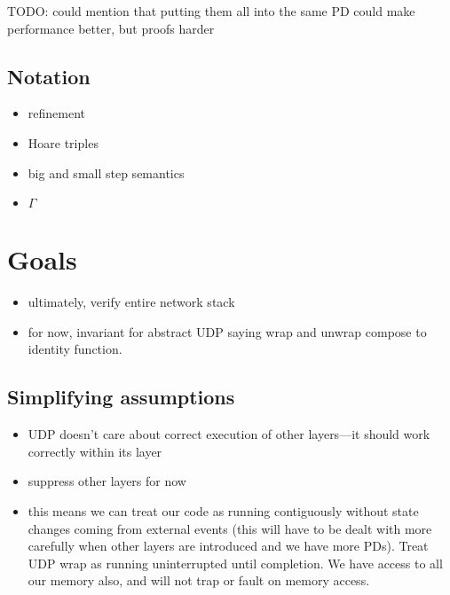 \documentclass[twoside]{memoir}
\begin{document}
TODO: could mention that putting them all into the same PD could make performance
better, but proofs harder

\subsection{Notation} %
\begin{itemize}
    \item refinement
    \item Hoare triples
    \item big and small step semantics
    \item $\Gamma$
\end{itemize}

\section{Goals}
\begin{itemize}
    \item ultimately, verify entire network stack
    \item for now, invariant for abstract UDP saying wrap and unwrap compose to identity function.
\end{itemize}

\subsection{Simplifying assumptions}
\begin{itemize}
    \item UDP doesn't care about correct execution of other layers---it should work correctly within its layer
    \item suppress other layers for now
    \item this means we can treat our code as running contiguously without state changes coming from external events (this will have to be dealt with more carefully when other layers are introduced and we have more PDs).
        Treat UDP wrap as running uninterrupted until completion.
        We have access to all our memory also, and will not trap or fault on memory access.
\end{itemize}
\end{document}
